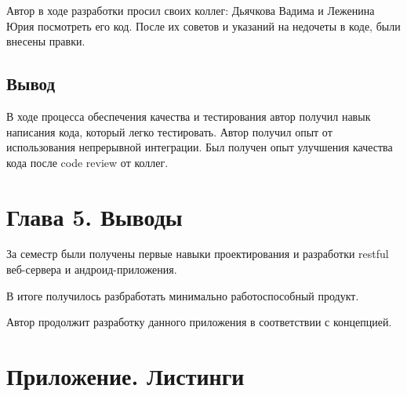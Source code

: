 Автор в ходе разработки просил своих коллег: Дьячкова Вадима и Леженина Юрия посмотреть его код. После их советов и указаний на недочеты в коде, были внесены правки.

\subsection*{Вывод}

В ходе процесса обеспечения качества и тестирования автор получил навык написания кода, который легко тестировать. Автор получил опыт от использования непрерывной интеграции. Был получен опыт улучшения качества кода после code review от коллег.

\section*{Глава 5. Выводы}

За семестр были получены первые навыки проектирования и разработки restful веб-сервера и андроид-приложения.

В итоге получилось разбработать минимально работоспособный продукт.

Автор продолжит разработку данного приложения в соответствии с концепцией.

\section*{Приложение. Листинги}


\parindent=1cm %


\parindent=1cm %


\parindent=1cm %

